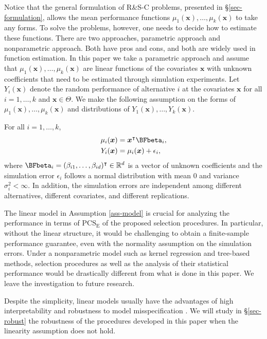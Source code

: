 \documentclass[ijoc,nonblindrev]{informs3}
\def\bx{{\bm x}}
\def\PCSE{\mathrm{PCS}_{\mathrm{E}}}
\begin{document}
Notice that the general formulation of R\&S-C problems, presented in \S \ref{sec-formulation}, allows the mean performance functions $\mu_1(\bx),\ldots,\mu_k(\bx)$ to take any forms.
To solve the problems, however, one needs to decide how to estimate these functions.
There are two approaches, parametric approach and nonparametric approach.
Both have pros and cons, and both are widely used in function estimation.
In this paper we take a parametric approach and assume that $\mu_1(\bx),\ldots,\mu_k(\bx)$ are linear functions of the covariates $\bx$ with unknown coefficients that need to be estimated through simulation experiments.
Let $Y_i(\bx)$ denote the random performance of alternative $i$ at the covariates $\bx$ for all $i=1,\ldots,k$ and $\bx\in\Theta$.
We make the following assumption on the forms of $\mu_1(\bx),\ldots,\mu_k(\bx)$ and distributions of $Y_1(\bx),\ldots,Y_k(\bx)$.


\begin{assumption} \label{ass-model}
For all $i=1,\ldots,k$,
\begin{align*}
\mu_i(\bx) &= \bx^\intercal \BFbeta_i,\\
Y_i(\bx) &= \mu_i(\bx) + \epsilon_i,
\end{align*}
where $\BFbeta_i =( \beta_{i1}, \ldots, \beta_{id})^\intercal \in \mathbb{R}^{d}$ is a vector of unknown coefficients and the simulation error $\epsilon_i$ follows a normal distribution with mean $0$ and variance $\sigma_i^2<\infty$.
In addition, the simulation errors are independent among different alternatives, different covariates, and different replications.
\end{assumption}


The linear model in Assumption \ref{ass-model} is crucial for analyzing the performance in terms of $\PCSE$ of the proposed selection procedures.
In particular, without the linear structure, it would be challenging to obtain a finite-sample performance guarantee,
even with the normality assumption on the simulation errors.
Under a nonparametric model such as kernel regression and tree-based methods, selection procedures as well as the analysis of their statistical performance would be drastically different from what is done in this paper.
We leave the investigation to future research.

Despite the simplicity, linear models usually have the advantages of high interpretability and robustness to model misspecification \citep{james2013}.
We will study in \S \ref{sec-robust} the robustness of the procedures developed in this paper when the linearity assumption does not hold.
\end{document}
